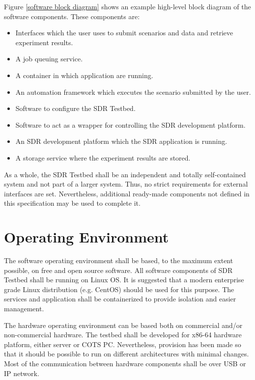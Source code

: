 \documentclass[english,titlepage,a4paper]{report}
\begin{document}
Figure \ref{software block diagram} shows an example high-level block diagram of the software components.
These components are:
\begin{itemize}
\item Interfaces which the user uses to submit \glspl{scenario} and data and retrieve \gls{experiment} results.
\item A \gls{job} queuing service.
\item A container in which application are running.
\item An automation framework which executes the \gls{scenario} submitted by the user.
\item Software to configure the \gls{SDR Testbed}.
\item Software to act as a wrapper for controlling the \gls{SDR development platform}.
\item An \gls{SDR development platform} which the \gls{SDR application} is running.
\item A storage service where the \gls{experiment} results are stored.
\end{itemize}

As a whole, the \gls{SDR Testbed} shall be an independent and totally self-contained system and not part of a larger system.
Thus, no strict requirements for external interfaces are set.
Nevertheless, additional ready-made components not defined in this specification may be used to complete it.

\newpage
\section{Operating Environment}

The software operating environment shall be based, to the maximum extent possible, on free and open source software.
All software components of \gls{SDR Testbed} shall be running on \gls{Linux} \acrshort{OS}.
It is suggested that a modern enterprise grade \gls{Linux} distribution (e.g. \gls{CentOS}) should be used for this purpose.
The services and application shall be containerized to provide isolation and easier management.

The hardware operating environment can be based both on commercial and/or non-commercial hardware.
The testbed shall be developed for \gls{x86-64} hardware platform, either server or \acrshort{COTS PC}.
Nevertheless, provision has been made so that it should be possible to run on different architectures with minimal changes.
Most of the communication between hardware components shall be over \acrshort{USB} or \acrshort{IP} network.
\end{document}
